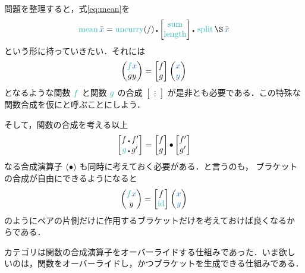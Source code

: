 \documentclass[a5paper,twoside,fleqn,draft]{jsbook}
\begin{document}
問題を整理すると，式\eqref{eq:mean}を
\begin{equation}
  \mMean\hListVarWith{x}
  =\hUncurry(/)
  \hCompose
  \begin{bmatrix}
    \mSum\\
    \mLength
  \end{bmatrix}
  \hCompose{}
  \mSplit
  \hApply
  \hListVarWith{x}
\end{equation}
という形に持っていきたい．それには
\begin{equation}
  \hPairWith{\hFunc{f}\hVar{x}}{gy}
  =
  \begin{bmatrix}
    f\\
    g
  \end{bmatrix}
  \hPairWith{\hVar{x}}{\hVar{y}}
\end{equation}
となるような関数 $\hFunc{f}$ と関数 $\hFunc{g}$ の合成
$\begin{bmatrix}\vdots\end{bmatrix}$ が是非とも必要である．この特殊な
  関数合成を仮にと呼ぶことにしよう．

そして，関数の合成を考える以上
\begin{equation}
  \begin{bmatrix}
    f\hCompose f'\\
    \hFunc{g}\hCompose g'
  \end{bmatrix}
  =
  \begin{bmatrix}
    f\\
    g
  \end{bmatrix}
  \mCompCat
  \begin{bmatrix}
    f'\\
    g'
  \end{bmatrix}
\end{equation}
なる合成演算子 $(\operatorname{\bullet})$ も同時に考えておく必要がある．と言うのも，
ブラケットの合成が自由にできるようになると
\begin{equation}
  \hPairWith{\hFunc{f}\hVar{x}}{y}
  =
  \begin{bmatrix}
    f\\
    \mId
  \end{bmatrix}
  \hPairWith{\hVar{x}}{\hVar{y}}
\end{equation}
のようにペアの片側だけに作用するブラケットだけを考えておけば良くなるか
らである．

\separator

カテゴリは関数の合成演算子をオーバーライドする仕組みであった．いま欲し
いのは，関数をオーバーライドし，かつブラケットを生成できる仕組みである．
\end{document}
